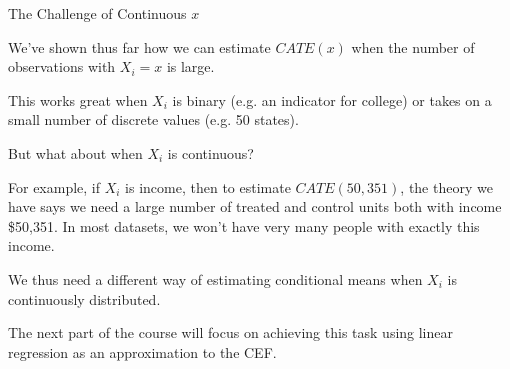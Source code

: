 \documentclass[11pt,english,handout]{beamer}
\newenvironment{wideitemize}{\itemize\addtolength{\itemsep}{10pt}}{\enditemize}
\begin{document}
\begin{frame}{The Challenge of Continuous $x$}
	
\begin{wideitemize} 
\item
We've shown thus far how we can estimate $CATE(x)$ when the number of observations with $X_i=x$ is large. 

\item
This works great when $X_i$ is binary (e.g. an indicator for college) or takes on a small number of discrete values (e.g. 50 states).

\pause
\item
But what about when $X_i$ is continuous? 

\pause
\item
For example, if $X_i$ is income, then to estimate $CATE(50,351)$, the theory we have says we need a large number of treated and control units both with income \$50,351. In most datasets, we won't have very many people with exactly this income.

\pause
\item
We thus need a different way of estimating conditional means when $X_i$ is continuously distributed.

\pause
\item
The next part of the course will focus on achieving this task using linear regression as an approximation to the CEF. 
\end{wideitemize}	
	
\end{frame} 
\end{document}

